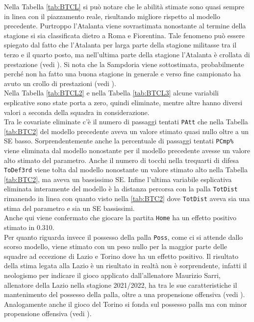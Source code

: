 Nella Tabella \ref{tab:BTCL} si può notare che le abilità stimate sono quasi sempre  in linea con il piazzamento reale, risultando migliore rispetto al modello precedente. Purtroppo l'Atalanta viene sovrastimata nonostante al termine della stagione si sia classificata dietro a Roma e Fiorentina. Tale fenomeno può essere spiegato dal fatto che l'Atalanta per larga parte della stagione militasse tra il terzo e il quarto posto, ma nell'ultima parte della stagione l'Atalanta è crollata di prestazione (vedi \textit{\cite{storyAta}}). Si nota che la Sampdoria viene sottostimata, probabilmente perché non ha fatto una buona stagione in generale e verso fine campionato ha avuto un crollo di prestazioni (vedi \textit{\cite{storySamp}}).\\

Nella Tabella \ref{tab:BTCL2} e nella Tabella \ref{tab:BTCL3} alcune variabili esplicative sono state porta a zero, quindi eliminate, mentre altre hanno diversi valori a seconda della squadra in considerazione. \\
Tra le covariate eliminate c'è il numero di passaggi tentati \texttt{PAtt} che nella Tabella \ref{tab:BTC2} del modello precedente aveva un valore stimato quasi nullo oltre a un SE basso. Sorprendentemente anche la percentuale di passaggi tentati \texttt{PCmp\%} viene eliminata dal modello nonostante per il modello precedente avesse un valore alto stimato del parametro. Anche il numero di tocchi nella trequarti di difesa \texttt{ToDef3rd} viene tolta dal modello nonostante un valore stimato alto nella Tabella \ref{tab:BTC2}, ma aveva un bassissimo SE. Infine l'ultima variabile esplicativa eliminata interamente del modello è la distanza percorsa con la palla \texttt{TotDist} rimanendo in linea con quanto visto nella \ref{tab:BTC2} dove \texttt{TotDist} aveva sia una stima del parametro e sia un SE bassissimi.\\
Anche qui viene confermato che giocare la partita \texttt{Home} ha un effetto positivo stimato in 0.310.\\
Per quanto riguarda invece il possesso della palla \texttt{Poss}, come ci si attende dallo scorso modello, viene stimato con un peso nullo per la maggior parte delle squadre ad eccezione di Lazio e Torino dove ha un effetto positivo. Il risultato della stima legata alla Lazio è un risultato in realtà non è sorprendente, infatti il \textit{\cite{sarrismotr}} neologismo per indicare il gioco applicato dall'allenatore Maurizio Sarri, allenatore della Lazio nella stagione 2021/2022, ha tra le sue caratteristiche il mantenimento del possesso della palla, oltre a una propensione offensiva (vedi \textit{\cite{sarrismo}}). Analogamente anche il gioco del Torino si fonda sul possesso palla ma con minor propensione offensiva (vedi \textit{\cite{torino}}).\\
